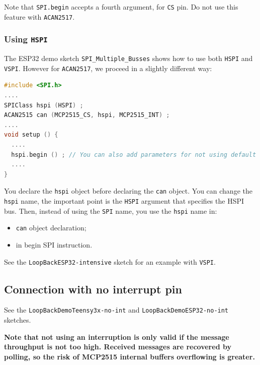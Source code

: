 \documentclass[10pt, a4paper, obeyspaces]{extarticle}
\newcommand \subsectionLabel[2]{\subsection{#1}\label{subsec:#2}}
\begin{document}
Note that \texttt{SPI.begin} accepts a fourth argument, for \texttt{CS} pin. Do not use this feature with \texttt{ACAN2517}.

\subsubsection{Using \texttt{HSPI}}

The ESP32 demo sketch \texttt{SPI\_Multiple\_Busses} shows how to use both \texttt{HSPI} and  \texttt{VSPI}. However for \texttt{ACAN2517}, we proceed in a slightly different way:
{ \small\begin{lstlisting}[language=c++]
#include <SPI.h>
....
SPIClass hspi (HSPI) ;
ACAN2515 can (MCP2515_CS, hspi, MCP2515_INT) ;
....
void setup () {
  ....
  hspi.begin () ; // You can also add parameters for not using default pins
  ....
}
\end{lstlisting}}

You declare the \texttt{hspi} object before declaring the \texttt{can} object. You can change the \texttt{hspi} name, the important point is the \texttt{HSPI} argument that specifies the HSPI bus. Then, instead of using the \texttt{SPI} name, you use the \texttt{hspi} name in:
\begin{itemize}
  \item \texttt{can} object declaration;
  \item in begin SPI instruction.
\end{itemize}

See the \texttt{LoopBackESP32-intensive} sketch for an example with \texttt{VSPI}.




\subsectionLabel{Connection with no interrupt pin}{noInterruptPin}

See the \texttt{LoopBackDemoTeensy3x-no-int} and \texttt{LoopBackDemoESP32-no-int} sketches.

{\bf Note that not using an interruption is only valid if the message throughput is not too high. Received messages are recovered by polling, so the risk of MCP2515 internal buffers overflowing is greater.}
\end{document}
